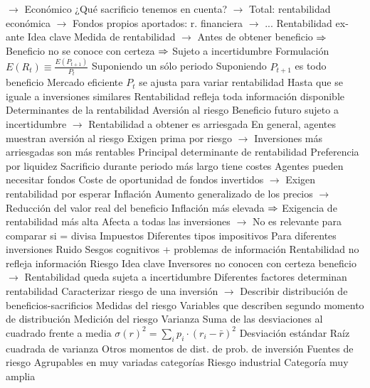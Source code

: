 \documentclass{nuevotema}
\begin{document}
\begin{esquemal}
				\4[] $\to$ Económico
				\4[] ¿Qué sacrificio tenemos en cuenta?
				\4[] $\to$ Total: rentabilidad económica
				\4[] $\to$ Fondos propios aportados: r. financiera
				\4[] $\to$ ...
		\2 Rentabilidad ex-ante
			\3 Idea clave
				\4 Medida de rentabilidad
				\4[] $\to$ Antes de obtener beneficio
				\4[] $\then$ Beneficio no se conoce con certeza
				\4[] $\then$ Sujeto a incertidumbre
			\3 Formulación
				\4 $E(R_t) \equiv \frac{E(P_{t+1})}{P_{t}}$
				\4[$\to$] Suponiendo un sólo periodo
				\4[$\to$] Suponiendo $P_{t+1}$ es todo beneficio
			\3 Mercado eficiente
				\4 $P_t$ se ajusta para variar rentabilidad
				\4[] Hasta que se iguale a inversiones similares
				\4[$\then$] Rentabilidad refleja toda información disponible
		\2 Determinantes de la rentabilidad
			\3 Aversión al riesgo
				\4 Beneficio futuro sujeto a incertidumbre
				\4[] $\to$ Rentabilidad a obtener es arriesgada
				\4 En general, agentes muestran aversión al riesgo
				\4[] Exigen prima por riesgo
				\4[] $\to$ Inversiones más arriesgadas son más rentables
				\4 Principal determinante de rentabilidad
			\3 Preferencia por liquidez
				\4 Sacrificio durante periodo más largo tiene costes
				\4[] Agentes pueden necesitar fondos
				\4[] Coste de oportunidad de fondos invertidos
				\4[] $\to$ Exigen rentabilidad por esperar
			\3 Inflación
				\4 Aumento generalizado de los precios
				\4[] $\to$ Reducción del valor real del beneficio
				\4 Inflación más elevada
				\4[] $\then$ Exigencia de rentabilidad más alta
				\4 Afecta a todas las inversiones
				\4[] $\to$ No es relevante para comparar si = divisa
			\3 Impuestos
				\4 Diferentes tipos impositivos
				\4[] Para diferentes inversiones
			\3 Ruido
				\4 Sesgos cognitivos + problemas de información
				\4[] Rentabilidad no refleja información
		\2 Riesgo
			\3 Idea clave
				\4 Inversores no conocen con certeza beneficio
				\4[] $\to$ Rentabilidad queda sujeta a incertidumbre
				\4 Diferentes factores determinan rentabilidad
				\4 Caracterizar riesgo de una inversión
				\4[] $\to$ Describir distribución de beneficios-sacrificios
				\4 Medidas del riesgo
				\4[] Variables que describen segundo momento de distribución
			\3 Medición del riesgo
				\4 Varianza
				\4[] Suma de las desviaciones al cuadrado frente a media
				\4[] $\sigma(r)^2 = \sum_{i} p_i \cdot (r_i - \bar{r})^2$
				\4 Desviación estándar
				\4[] Raíz cuadrada de varianza
				\4 Otros momentos de dist. de prob. de inversión
			\3 Fuentes de riesgo
				\4 Agrupables en muy variadas categorías
				\4 Riesgo industrial
				\4[] Categoría muy amplia

\end{esquemal}
\end{document}
